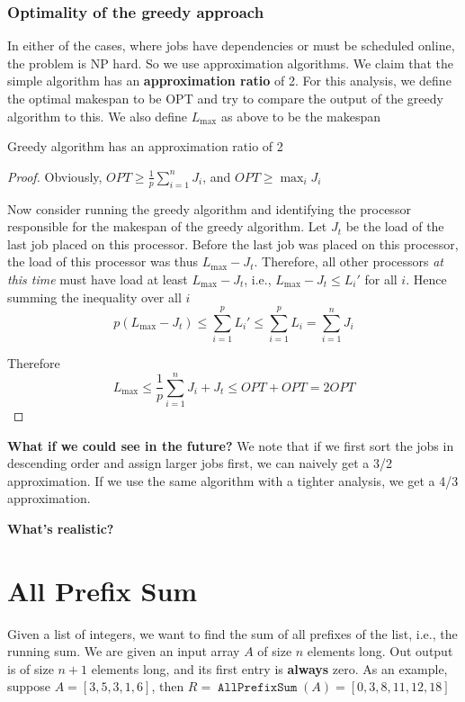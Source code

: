 \documentclass[11pt]{article}
\DeclareMathOperator{\AllPrefixSum}{\texttt{AllPrefixSum}}
\begin{document}
\subsubsection{Optimality of the greedy approach}
\label{sec:org79c5899}
In either of the cases, where jobs have dependencies or must be scheduled online, the problem is
NP hard. So we use approximation algorithms. We claim that the simple algorithm has an
\textbf{approximation ratio} of 2. For this analysis, we define the optimal makespan to be OPT and try to
compare the output of the greedy algorithm to this. We also define \(L_{\max}\) as above to be
the makespan

\begin{claim}
Greedy algorithm has an approximation ratio of 2
\end{claim}

\begin{proof}
Obviously, \(OPT\ge\frac{1}{p}\sum_{i=1}^nJ_i\), and \(OPT\ge\max_iJ_i\)

Now consider running the greedy algorithm and identifying the processor responsible for the
makespan of the greedy algorithm. Let \(J_t\) be the load of the last job placed on this
processor. Before the last job was placed on this processor, the load of this processor was
thus \(L_{\max}-J_t\). Therefore, all other processors \emph{at this time} must have load at
least \(L_{\max}-J_t\), i.e., \(L_{\max}-J_t\le L_i'\) for all \(i\). Hence summing the inequality
over all \(i\)
\begin{equation*}
p(L_{\max}-J_t)\le\sum_{i=1}^pL_i'\le\sum_{i=1}^pL_i=\sum_{i=1}^nJ_i
\end{equation*}

Therefore
\begin{equation*}
L_{\max}\le\frac{1}{p}\sum_{i=1}^nJ_i+J_t\le OPT+OPT=2OPT
\end{equation*}
\end{proof}

\textbf{What if we could see in the future?} We note that if we first sort the jobs in descending order
and assign larger jobs first, we can naively get a 3/2 approximation. If we use the same
algorithm with a tighter analysis, we get a 4/3 approximation.

\textbf{What's realistic?}
\section{All Prefix Sum}
\label{sec:org14f6c3a}
Given a list of integers, we want to find the sum of all prefixes of the list, i.e., the
running sum. We are given an input array \(A\) of size \(n\) elements long. Out output is of
size \(n+1\) elements long, and its first entry is \textbf{always} zero. As an example,
suppose \(A=[3,5,3,1,6]\), then \(R=\AllPrefixSum(A)=[0,3,8,11,12,18]\)
\end{document}
